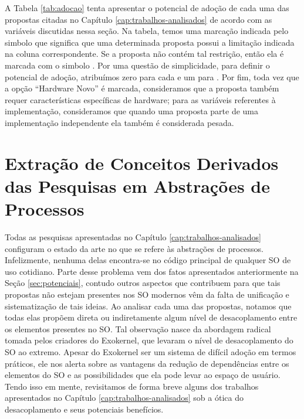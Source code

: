 A Tabela \ref{tab:adocao} tenta apresentar o potencial de adoção de cada uma
das propostas citadas no Capítulo \ref{cap:trabalhos-analisados} de acordo com
as variáveis discutidas nessa seção. Na tabela, temos uma marcação indicada
pelo simbolo  que significa que uma determinada proposta possui a
limitação indicada na coluna correspondente. Se a proposta não contém tal restrição, então ela
é marcada com o simbolo . Por uma questão de simplicidade, para
definir o potencial de adoção, atribuímos zero para cada  e um para
. Por fim, toda vez que a opção ``Hardware Novo'' é marcada,
consideramos que a proposta também requer características específicas de
hardware; para as variáveis referentes à implementação, consideramos que quando
uma proposta parte de uma implementação independente ela também é considerada
pesada.



\section{Extração de Conceitos Derivados das Pesquisas em Abstrações de Processos}
\label{sec:extracao}

Todas as pesquisas apresentadas no Capítulo \ref{cap:trabalhos-analisados}
configuram o estado da arte no que se refere às abstrações de processos.
Infelizmente, nenhuma delas encontra-se no código principal de qualquer SO de
uso cotidiano. Parte desse problema vem dos fatos apresentados anteriormente na Seção
\ref{sec:potenciais}, contudo outros aspectos que contribuem para que tais
propostas não estejam presentes nos SO modernos vêm da falta de unificação e
sistematização de tais ideias. Ao analisar cada uma das propostas, notamos que
todas elas propõem direta ou indiretamente algum nível de desacoplamento entre
os elementos presentes no SO. Tal observação nasce da abordagem radical tomada
pelos criadores do Exokernel, que levaram o nível de desacoplamento do SO ao
extremo. Apesar do Exokernel ser um sistema de difícil adoção em termos
práticos, ele nos alerta sobre as vantagens da redução de dependências
entre os elementos do SO e as possibilidades que ela pode levar ao espaço de
usuário. Tendo isso em mente, revisitamos de forma breve alguns dos trabalhos
apresentados no Capítulo \ref{cap:trabalhos-analisados} sob a ótica do
desacoplamento e seus potenciais benefícios.

